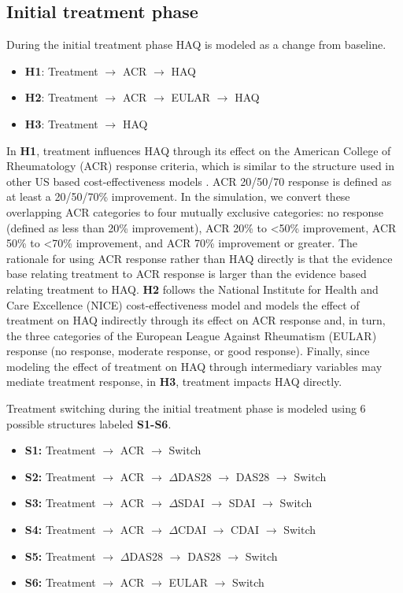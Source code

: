 \documentclass[11pt,final,fleqn]{article}\usepackage[]{graphicx}\usepackage[]{color}
\theoremstyle{plain}
\begin{document}
\subsection{Initial treatment phase}

During the initial treatment phase HAQ is modeled as a change from baseline.

\begin{itemize}
\item \textbf{H1}: Treatment $\rightarrow$ ACR $\rightarrow$ HAQ
\item \textbf{H2}: Treatment $\rightarrow$ ACR $\rightarrow$ EULAR $\rightarrow$ HAQ
\item \textbf{H3}: Treatment $\rightarrow$ HAQ
\end{itemize}

In \textbf{H1}, treatment influences HAQ through its effect on the American College of Rheumatology (ACR) response criteria, which is similar to the structure used in other US based cost-effectiveness models \citep[e.g.][]{carlson2015economic, icer2017tim}. ACR 20/50/70 response is defined as at least a 20/50/70\% improvement. In the simulation, we convert these overlapping ACR categories to four mutually exclusive categories: no response (defined as less than 20\% improvement), ACR 20\% to <50\% improvement, ACR 50\% to <70\% improvement, and ACR 70\% improvement or greater. The rationale for using ACR response rather than HAQ directly is that the evidence base relating treatment to ACR response is larger than the evidence based relating treatment to HAQ. \textbf{H2} follows the National Institute for Health and Care Excellence (NICE) cost-effectiveness model \citep{stevenson2016adalimumab, stevenson2017cost} and models the effect of treatment on HAQ indirectly through its effect on ACR response and, in turn, the three categories of the European League Against Rheumatism (EULAR) response (no response, moderate response, or good response). Finally, since modeling the effect of treatment on HAQ through intermediary variables may mediate treatment response, in \textbf{H3}, treatment impacts HAQ directly.

Treatment switching during the initial treatment phase is modeled using 6 possible structures labeled \textbf{S1-S6}.

\begin{itemize}
\item \textbf{S1:} Treatment $\rightarrow$ ACR $\rightarrow$ Switch
\item \textbf{S2:} Treatment $\rightarrow$ ACR $\rightarrow$ $\Delta$DAS28 $\rightarrow$ DAS28 $\rightarrow$ Switch 
\item \textbf{S3:} Treatment $\rightarrow$ ACR $\rightarrow$ $\Delta$SDAI $\rightarrow$ SDAI $\rightarrow$ Switch 
\item \textbf{S4:} Treatment $\rightarrow$ ACR $\rightarrow$ $\Delta$CDAI $\rightarrow$ CDAI $\rightarrow$ Switch 
\item \textbf{S5:} Treatment $\rightarrow$ $\Delta$DAS28 $\rightarrow$ DAS28 $\rightarrow$ Switch 
\item \textbf{S6:} Treatment $\rightarrow$ ACR $\rightarrow$ EULAR $\rightarrow$ Switch
\end{itemize}
\end{document}
